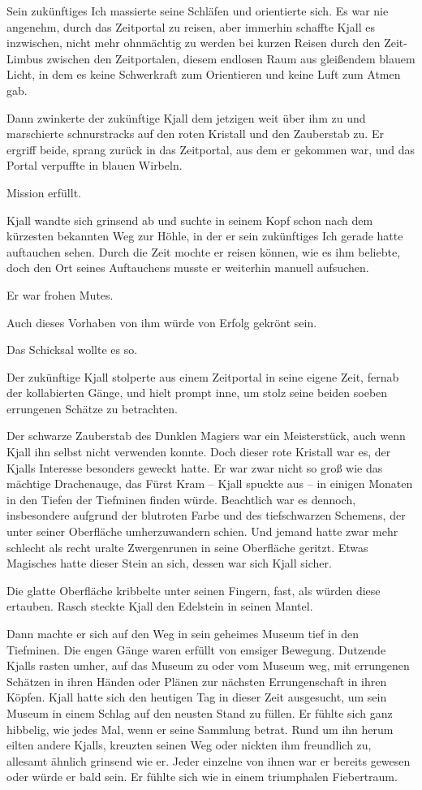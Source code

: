 Sein zukünftiges Ich massierte seine Schläfen und orientierte sich. Es war nie angenehm, durch das Zeitportal zu reisen, aber immerhin schaffte Kjall es inzwischen, nicht mehr ohnmächtig zu werden bei kurzen Reisen durch den Zeit-Limbus zwischen den Zeitportalen, diesem endlosen Raum aus gleißendem blauem Licht, in dem es keine Schwerkraft zum Orientieren und keine Luft zum Atmen gab.

Dann zwinkerte der zukünftige Kjall dem jetzigen weit über ihm zu und marschierte schnurstracks auf den roten Kristall und den Zauberstab zu. Er ergriff beide, sprang zurück in das Zeitportal, aus dem er gekommen war, und das Portal verpuffte in blauen Wirbeln.

Mission erfüllt.

Kjall wandte sich grinsend ab und suchte in seinem Kopf schon nach dem kürzesten bekannten Weg zur Höhle, in der er sein zukünftiges Ich gerade hatte auftauchen sehen. Durch die Zeit mochte er reisen können, wie es ihm beliebte, doch den Ort seines Auftauchens musste er weiterhin manuell aufsuchen.

Er war frohen Mutes.

Auch dieses Vorhaben von ihm würde von Erfolg gekrönt sein.

Das Schicksal wollte es so.\bigskip






Der zukünftige Kjall stolperte aus einem Zeitportal in seine eigene Zeit, fernab der kollabierten Gänge, und hielt prompt inne, um stolz seine beiden soeben errungenen Schätze zu betrachten.

Der schwarze Zauberstab des Dunklen Magiers war ein Meisterstück, auch wenn Kjall ihn selbst nicht verwenden konnte. Doch dieser rote Kristall war es, der Kjalls Interesse besonders geweckt hatte. Er war zwar nicht so groß wie das mächtige Drachenauge, das Fürst Kram – Kjall spuckte aus – in einigen Monaten in den Tiefen der Tiefminen finden würde. Beachtlich war es dennoch, insbesondere aufgrund der blutroten Farbe und des tiefschwarzen Schemens, der unter seiner Oberfläche umherzuwandern schien. Und jemand hatte zwar mehr schlecht als recht uralte Zwergenrunen in seine Oberfläche geritzt. Etwas Magisches hatte dieser Stein an sich, dessen war sich Kjall sicher.

Die glatte Oberfläche kribbelte unter seinen Fingern, fast, als würden diese ertauben. Rasch steckte Kjall den Edelstein in seinen Mantel.

Dann machte er sich auf den Weg in sein geheimes Museum tief in den Tiefminen. Die engen Gänge waren erfüllt von emsiger Bewegung. Dutzende Kjalls rasten umher, auf das Museum zu oder vom Museum weg, mit errungenen Schätzen in ihren Händen oder Plänen zur nächsten Errungenschaft in ihren Köpfen. Kjall hatte sich den heutigen Tag in dieser Zeit ausgesucht, um sein Museum in einem Schlag auf den neusten Stand zu füllen. Er fühlte sich ganz hibbelig, wie jedes Mal, wenn er seine Sammlung betrat. Rund um ihn herum eilten andere Kjalls, kreuzten seinen Weg oder nickten ihm freundlich zu, allesamt ähnlich grinsend wie er. Jeder einzelne von ihnen war er bereits gewesen oder würde er bald sein. Er fühlte sich wie in einem triumphalen Fiebertraum.

